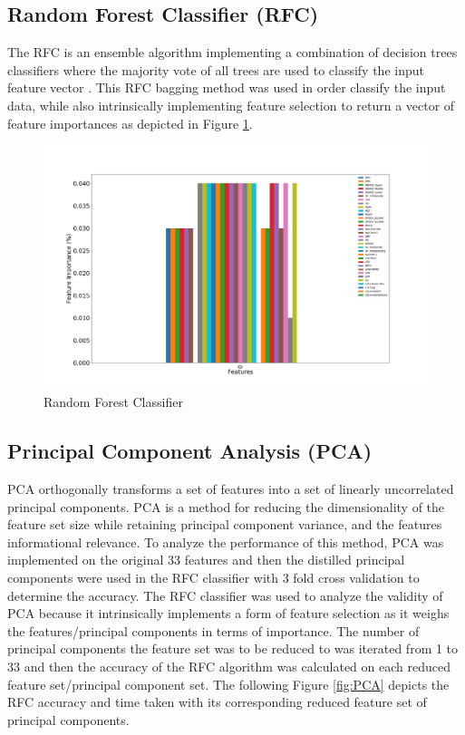 \documentclass{article}\raggedbottom
\begin{document}
\subsection{\color{red}Random Forest Classifier (RFC)}
The RFC is an ensemble algorithm implementing a combination of decision trees classifiers where the majority vote of all trees are used to classify the input feature vector \cite{pal2005random}. This RFC bagging method was used in order classify the input data, while also intrinsically implementing feature selection to return a vector of feature importances as depicted in Figure \ref{fig:RFC}. 

\begin{figure}[h!]
	\centering
	\includegraphics[width=\linewidth]{data/RFC_importancesT1.png}
	\caption{Random Forest Classifier}
	\label{fig:RFC}
\end{figure}

\subsection{Principal Component Analysis (PCA)}
PCA orthogonally transforms a set of features into a set of linearly uncorrelated principal components. PCA is a method for reducing the dimensionality of the feature set size while retaining principal component variance, and the features informational relevance. To analyze the performance of this method, PCA was implemented on the original 33 features and then the distilled principal components were used in the RFC classifier with 3 fold cross validation to determine the accuracy. The RFC classifier was used to analyze the validity of PCA because it intrinsically implements a form of feature selection as it weighs the features/principal components in terms of importance. The number of principal components the feature set was to be reduced to was iterated from 1 to 33 and then the accuracy of the RFC algorithm was calculated on each reduced feature set/principal component set. The following Figure \ref{fig:PCA} depicts the RFC accuracy and time taken with its corresponding reduced feature set of principal components.   
\end{document}
